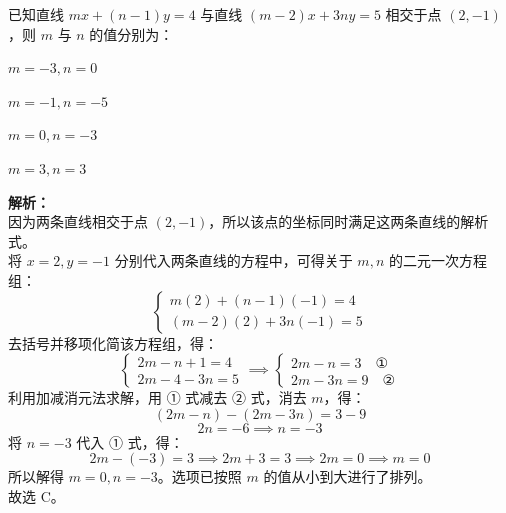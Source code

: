 \begin{question}
    已知直线 $mx + (n-1)y = 4$ 与直线 $(m-2)x + 3ny = 5$ 相交于点 $(2, -1)$，则 $m$ 与 $n$ 的值分别为： \paren[C]
    \begin{choices}
        \item $m = -3, n = 0$ \item $m = -1, n = -5$ \item $m = 0, n = -3$ \item $m = 3, n = 3$
    \end{choices}
\end{question}

\begin{solution}
    \textbf{解析：} \\
    因为两条直线相交于点 $(2, -1)$，所以该点的坐标同时满足这两条直线的解析式。 \\
    将 $x = 2, y = -1$ 分别代入两条直线的方程中，可得关于 $m, n$ 的二元一次方程组：
    $$
    \begin{cases}
    m(2) + (n-1)(-1) = 4 \\
    (m-2)(2) + 3n(-1) = 5
    \end{cases}
    $$
    去括号并移项化简该方程组，得：
    $$
    \begin{cases}
    2m - n + 1 = 4 \\
    2m - 4 - 3n = 5
    \end{cases}
    \implies
    \begin{cases}
    2m - n = 3 \quad \text{①} \\
    2m - 3n = 9 \quad \text{②}
    \end{cases}
    $$
    利用加减消元法求解，用 ① 式减去 ② 式，消去 $m$，得：
    $$(2m - n) - (2m - 3n) = 3 - 9$$
    $$2n = -6 \implies n = -3$$
    将 $n = -3$ 代入 ① 式，得：
    $$2m - (-3) = 3 \implies 2m + 3 = 3 \implies 2m = 0 \implies m = 0$$
    所以解得 $m = 0, n = -3$。选项已按照 $m$ 的值从小到大进行了排列。 \\
    故选 C。
\end{solution}

